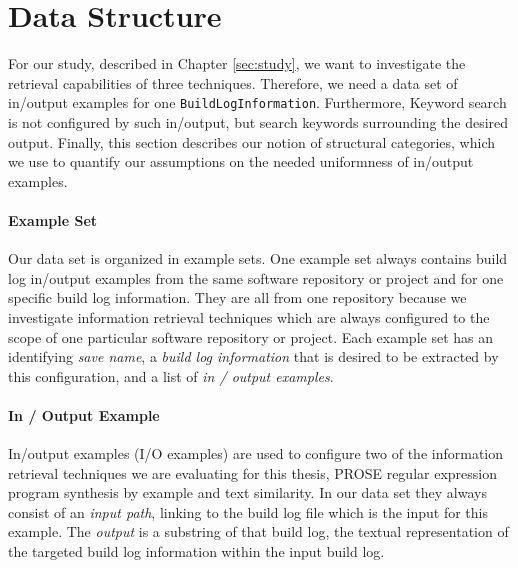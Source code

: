 \documentclass[\myrootdir/main.tex]{subfiles}
\begin{document}


\section{Data Structure}
For our study, described in Chapter \ref{sec:study}, we want to investigate the retrieval capabilities of three techniques. Therefore, we need a data set of in/output examples for one \texttt{BuildLogInformation}. Furthermore, Keyword search is not configured by such in/output, but search keywords surrounding the desired output. Finally, this section describes our notion of structural categories, which we use to quantify our assumptions on the needed uniformness of in/output examples.

\paragraph{Example Set}
Our data set is organized in example sets. One example set always contains build log in/output examples from the same software repository or project and for one specific build log information. They are all from one repository because we investigate information retrieval techniques which are always configured to the scope of one particular software repository or project.
Each example set has an identifying \emph{save name}, a \emph{build log information} that is desired to be extracted by this configuration, and a list of \emph{in / output examples}.

\paragraph{In / Output Example}
In/output examples (I/O examples) are used to configure two of the information retrieval techniques we are evaluating for this thesis, PROSE regular expression program synthesis by example and text similarity.
In our data set they always consist of an \emph{input path}, linking to the build log file which is the input for this example.
The \emph{output} is a substring of that build log, the textual representation of the targeted build log information within the input build log.
\end{document}
